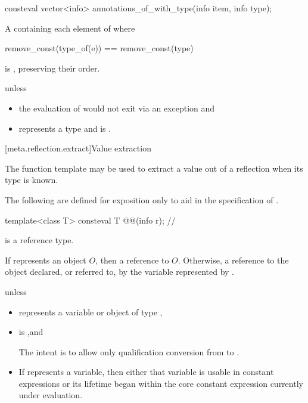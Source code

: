 %
\begin{itemdecl}
consteval vector<info> annotations_of_with_type(info item, info type);
\end{itemdecl}

\begin{itemdescr}
\pnum
\returns
A  containing each element  of 
where
\begin{codeblock}
remove_const(type_of(e)) == remove_const(type)
\end{codeblock}
is , preserving their order.

\pnum
\throws
{} unless
\begin{itemize}
\item
  the evaluation of
   would not exit via an exception and
\item
   represents a type and
   is .
\end{itemize}
\end{itemdescr}

[meta.reflection.extract]{Value extraction}

\pnum
The  function template may be used
to extract a value out of a reflection when its type is known.

\pnum
The following are defined for exposition only
to aid in the specification of .

\begin{itemdecl}
template<class T>
  consteval T @@(info r);      // \expos
\end{itemdecl}

\begin{itemdescr}
\pnum
\begin{note}
 is a reference type.
\end{note}

\pnum
\returns
If  represents an object $O$,
then a reference to $O$.
Otherwise, a reference to the object declared, or referred to,
by the variable represented by .

\pnum
\throws
{} unless
\begin{itemize}
\item
   represents a variable or object of type ,
\item
  is ,\newline and
  \begin{note}
  The intent is to allow only qualification conversion from  to .
  \end{note}
\item
  If  represents a variable,
  then either that variable is usable in constant expressions
  or its lifetime began within the core constant expression currently under evaluation.
\end{itemize}
\end{itemdescr}

